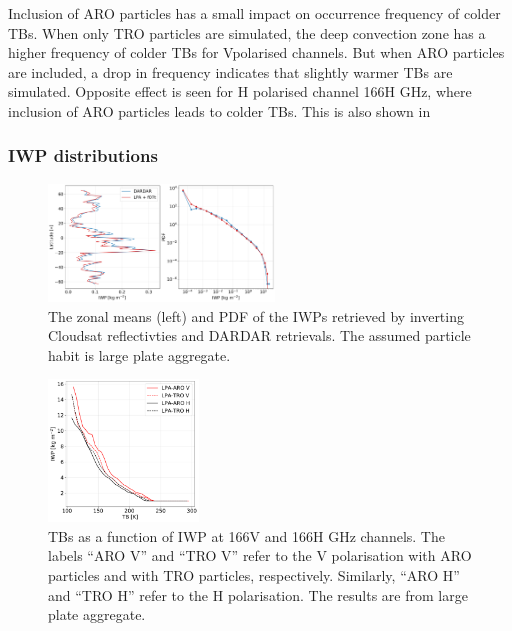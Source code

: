 \documentclass[amt, manuscript]{copernicus}
\begin{document}
Inclusion of ARO particles has a small impact on occurrence frequency of colder TBs. When only TRO particles are simulated, the deep convection zone has a higher frequency of colder TBs for Vpolarised channels. But when ARO particles are included, a drop in frequency indicates that slightly warmer TBs are simulated. Opposite effect is seen for H polarised channel 166H\,\,GHz, where inclusion of ARO particles leads to colder TBs. This is also shown in 




\subsubsection{IWP distributions}
%
\begin{figure}[t]
	\includegraphics[width=6cm]{Figures/PDF_IWP_DARDAR.pdf}
	\caption{The zonal means (left) and  PDF of  the IWPs retrieved by inverting Cloudsat reflectivties and  DARDAR retrievals. The assumed particle habit is large plate aggregate.}
	\label{fig:IWP_DARDAR}
\end{figure}
\begin{figure}[t]
	\includegraphics[width=4cm]{Figures/TB_IWP.pdf}
	\caption{TBs as a function of IWP at 166V and 166H\,\,GHz channels. The labels ``ARO V'' and ``TRO V'' refer to the V polarisation with ARO particles and with TRO particles, respectively. Similarly, ``ARO H'' and ``TRO H'' refer to the H polarisation. The results are from large plate aggregate.}
	\label{fig:TB_IWP}
\end{figure}
\end{document}
